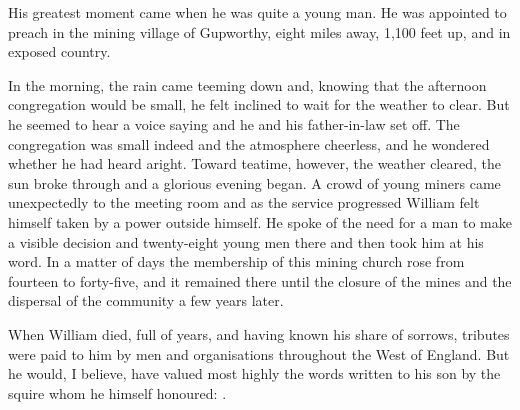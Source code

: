 His greatest moment came when he was quite a young man. He was appointed to preach in the mining village of Gupworthy, eight miles away, 1,100 feet up, and in exposed country.

In the morning, the rain came teeming down and, knowing that the afternoon congregation would be small, he felt inclined to wait for the weather to clear. But he seemed to hear a voice saying  and he and his father-in-law set off. The congregation was small indeed and the atmosphere cheerless, and he wondered whether he had heard aright. Toward teatime, however, the weather cleared, the sun broke through and a glorious evening began. A crowd of young miners came unexpectedly to the meeting room and as the service progressed William felt himself taken by a power outside himself. He spoke of the need for a man to make a visible decision and twenty-eight young men there and then took him at his word. In a matter of days the membership of this mining church rose from fourteen to forty-five, and it remained there until the closure of the mines and the dispersal of the community a few years later.

When William died, full of years, and having known his share of sorrows, tributes were paid to him by men and organisations throughout the West of England. But he would, I believe, have valued most highly the words written to his son by the squire whom he himself honoured: .
